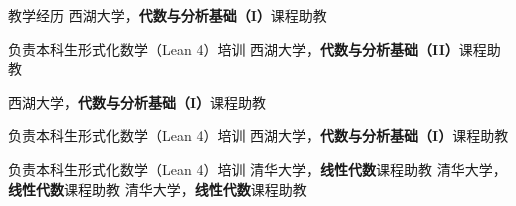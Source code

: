 \begin{rubric}{教学经历}
    \entry*[2026，秋季学期] 西湖大学，\textbf{代数与分析基础（I）}课程助教
    \par 负责本科生形式化数学（Lean 4）培训
    \entry*[2026，春季学期] 西湖大学，\textbf{代数与分析基础（II）}课程助教
    \par 西湖大学，\textbf{代数与分析基础（I）}课程助教
    \par 负责本科生形式化数学（Lean 4）培训
    \entry*[2025，秋季学期] 西湖大学，\textbf{代数与分析基础（I）}课程助教
    \par 负责本科生形式化数学（Lean 4）培训
    \entry*[2024，秋季学期] 清华大学，\textbf{线性代数}课程助教
    \entry*[2023，秋季学期] 清华大学，\textbf{线性代数}课程助教
    \entry*[2022，秋季学期] 清华大学，\textbf{线性代数}课程助教
\end{rubric}